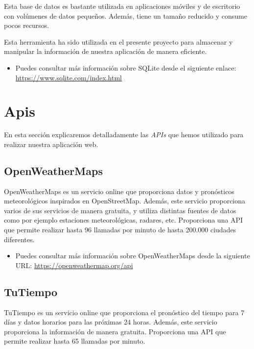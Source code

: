 Esta base de datos es bastante utilizada en aplicaciones móviles y de escritorio con volúmenes de datos pequeños. Además, tiene un tamaño reducido y consume pocos recursos.

Esta herramienta ha sido utilizada en el presente proyecto para almacenar y manipular la información de nuestra aplicación de manera eficiente.

\begin{itemize}
    \item Puedes consultar más información sobre SQLite desde el siguiente enlace: \url{https://www.sqlite.com/index.html}
\end{itemize}

\section{Apis}

En esta sección explicaremos detalladamente las \textit{APIs} que hemos utilizado para realizar nuestra aplicación web.

\subsection{OpenWeatherMaps} \label{API OpenWeatherMaps}

OpenWeatherMaps es un servicio online que proporciona datos y pronósticos meteorológicos inspirados en OpenStreetMap. Además, este servicio proporciona varios de sus servicios de manera gratuita, y utiliza distintas fuentes de datos como por ejemplo estaciones meteorológicas, radares, etc. 
Proporciona una API que permite realizar hasta  96 llamadas por minuto de hasta 200.000 ciudades diferentes.

\begin{itemize}
    \item Puedes consultar más información sobre OpenWeatherMaps desde la siguiente URL: \url{https://openweathermap.org/api}
\end{itemize}

\subsection{TuTiempo} \label{API TuTiempo}
TuTiempo es un servicio online que proporciona el pronóstico del tiempo para 7 días y datos horarios para las próximas 24 horas. Además, este servicio proporciona la información de manera gratuita. Proporciona una API que permite realizar hasta 65 llamadas por minuto.

